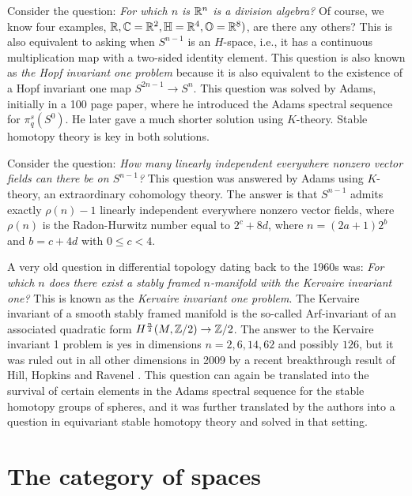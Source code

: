 \documentclass{article}[11pt]
\begin{document}
\begin{example} Consider the question: \emph{For which $n$ is $\mathbb{R}^n$ is a division algebra?} Of course, we know four examples, $\mathbb{R}, \mathbb{C}=\mathbb{R}^2, \mathbb{H}=\mathbb{R}^4, \mathbb{O}=\mathbb{R}^8)$, are there any others? This is also equivalent to asking when $S^{n-1}$ is an $H$-space, i.e., it has a continuous multiplication map with a two-sided identity element. This question is also known as \emph{the Hopf invariant one problem} because it is also equivalent to the existence of a Hopf invariant one map $S^{2n-1}\to S^n$. This question was  solved by Adams, initially in a 100 page paper, where he introduced the Adams spectral sequence for $\pi_q^s(S^0)$. He later gave a much shorter solution using $K$-theory. Stable homotopy theory is key in both solutions.
\end{example}

\begin{example} Consider the question: \emph{How many linearly independent everywhere nonzero vector fields can there be on $S^{n-1}$?} This question was answered by Adams using $K$-theory, an extraordinary cohomology theory. The answer is that $S^{n-1}$ admits exactly $\rho(n)-1$ linearly independent everywhere nonzero vector fields, where $\rho(n)$ is the Radon-Hurwitz number equal to $2^c+8d$, where $n=(2a+1)2^b$ and $b=c+4d$ with $0\leq c<4$.
\end{example}

\begin{example} A very old question in differential topology dating back to the 1960s was: \emph{For which $n$ does there exist a stably framed $n$-manifold with the Kervaire invariant one?} This is known as the \emph{Kervaire invariant one problem}. The Kervaire invariant of a smooth stably framed manifold is the so-called Arf-invariant of an associated quadratic form $H^{\frac{n}{2}}(M, \mathbb{Z}/2)\to\mathbb{Z}/2$. The answer to the Kervaire invariant 1 problem is yes in dimensions $n=2,6,14,62$ and possibly $126$, but it was ruled out in all other dimensions in 2009 by a recent breakthrough result of Hill, Hopkins and Ravenel \cite{HHR}. This question can again be translated into the survival of certain elements in the Adams spectral sequence for the stable homotopy groups of spheres, and it was further translated by the authors into a question in equivariant stable homotopy theory and solved in that setting.
\end{example}


\section{The category of spaces}
\end{document}
